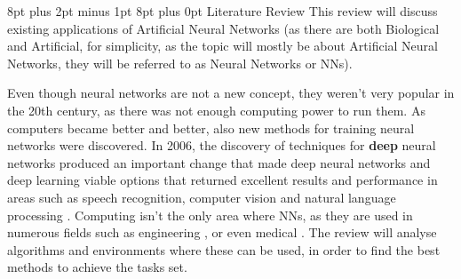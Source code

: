 \documentclass[12pt,a4paper]{article}
\makeatletter
\renewcommand\section{\@startsection {section}{1}{0mm} %
                               {8pt plus 2pt minus 1pt} %
                               {8pt plus 0pt} %
                               {\bfseries}}
\makeatother
\begin{document}
\section{Literature Review}
This review will discuss existing applications of Artificial Neural Networks (as there are both Biological and Artificial, for simplicity, as the topic will mostly be about Artificial Neural Networks, they will be referred to as Neural Networks or NNs).\par
Even though neural networks are not a new concept, they weren’t very popular in the 20th century, as there was not enough computing power to run them. As computers became better and better, also new methods for training neural networks were discovered. In 2006, the discovery of techniques for \textbf{deep} neural networks produced an important change that made deep neural networks and deep learning viable options that returned excellent results and performance in areas such as speech recognition, computer vision and natural language processing  \cite{nielsenneural}.
Computing isn’t the only area where NNs, as they are used in numerous fields such as engineering \cite{aydinalp-koksal_comparison_2008}, or even medical \cite{baxt_use_1991}.
The review will analyse algorithms and environments where these can be used, in order to find the best methods to achieve the tasks set.
\end{document}
